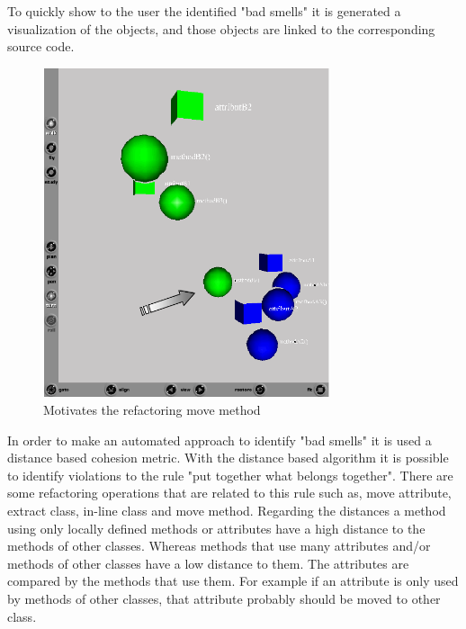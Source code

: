 To quickly show to the user the identified "bad smells" it is generated a visualization of the objects, and those objects are linked to the corresponding source code. 

\begin{figure}[h!]
  \centering
  \includegraphics[width=0.75\textwidth]{img/metricsbasedrefactoring.png}
  \caption{Motivates the refactoring move method}
  \label{fig:MetricsBasedRefactoring}
\end{figure}

In order to make an automated approach to identify "bad smells" it is used a distance based cohesion metric.
With the distance based algorithm it is possible to identify violations to the rule "put together what belongs together". 
There are some refactoring operations that are related to this rule such as, move attribute, extract class, in-line class and move method. 
Regarding the distances a method using only locally defined methods or attributes have a high distance to the methods of other classes. 
Whereas methods that use many attributes and/or methods of other classes have a low distance to them. 
The attributes are compared by the methods that use them. 
For example if an attribute is only used by methods of other classes, that attribute probably should be moved to other class.



